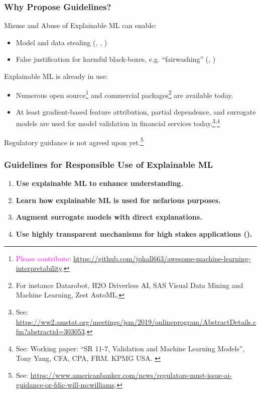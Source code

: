 \documentclass[11pt,aspectratio=169,hyperref={colorlinks}]{beamer}
\begin{document}
	\begin{frame}[t]
	
		\frametitle{Why Propose Guidelines?}		

		Misuse and Abuse of Explainable ML can enable:
		\begin{itemize}\footnotesize
			\item Model and data stealing (\citet{model_stealing}, \citet{membership_inference}, \citet{shokri2019privacy})
			\item False justification for harmful black-boxes, e.g. ``fairwashing'' (\citet{fair_washing}, \citet{please_stop})
		\end{itemize}
		\vspace{5pt}		
		Explainable ML is already in use: 
		\begin{itemize}\footnotesize
		\item Numerous open source\footnote{\tiny{\textcolor{magenta}{Please contribute:} \url{https://github.com/jphall663/awesome-machine-learning-interpretability}.}} and commercial packages\footnote{\tiny{For instance Datarobot, H2O Driverless AI, SAS Visual Data Mining and Machine Learning, Zest AutoML.}} are available today.
		\item At least gradient-based feature attribution, partial dependence, and surrogate models are used for model validation in financial services today.\footnote{\tiny{See: \url{https://ww2.amstat.org/meetings/jsm/2019/onlineprogram/AbstractDetails.cfm?abstractid=303053}.}}\textsuperscript{,}\footnote{\tiny{See: Working paper: ``SR 11-7, Validation and Machine Learning Models'', Tony Yang, CFA, CPA, FRM. KPMG USA. \label{fn:yang}}} 
		\end{itemize}
		\vspace{5pt}	
		Regulatory guidance is not agreed upon yet.\footnote{\tiny{See: \url{https://www.americanbanker.com/news/regulators-must-issue-ai-guidance-or-fdic-will-mcwilliams}.}}
		\normalsize	
		
	\end{frame}

	\begin{frame}
	
		\frametitle{Guidelines for Responsible Use of Explainable ML}
		
		\begin{enumerate}\Large
			\item \textbf{Use explainable ML to enhance understanding.}
			\item \textbf{Learn how explainable ML is used for nefarious purposes.}
			\item \textbf{Augment surrogate models with direct explanations.}
			\item \textbf{Use highly transparent mechanisms for high stakes applications (\citet{please_stop}).}
		\end{enumerate}
		
	\end{frame}
\end{document}
